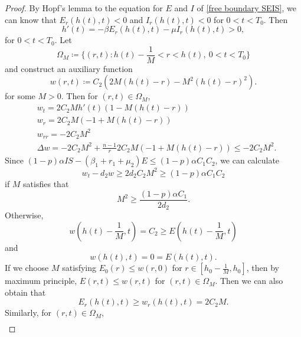 \documentclass[11pt]{amsart}
\numberwithin{equation}{section}
\theoremstyle{plain}
\theoremstyle{definition}
\begin{document}
	\begin{proof}
		By Hopf's lemma to the equation for $E$ and $I$ of \cref{free boundary SEIS}, we can know that $E_r(h(t),t)<0$ and $I_r(h(t),t)<0$ for $0<t<T_0$.
		Then
		\begin{equation*}
			h'(t)=-\beta E_r(h(t),t)-\mu I_r(h(t),t)>0,
		\end{equation*}
		for $0<t<T_0$.
		Let
		\begin{equation*}
			\Omega_M \coloneqq\{(r,t):h(t)-\frac{1}{M}<r<h(t),\ 0<t<T_0\}
		\end{equation*}
		and construct an auxiliary function
		\begin{equation*}
			w(r,t) \coloneqq C_2(2M(h(t)-r)-M^2(h(t)-r)^2).
		\end{equation*}
		for some $M>0$. Then for $(r,t) \in \Omega_M$,
		\begin{equation*}
		\begin{aligned}
			&w_t=2C_2Mh'(t)(1-M(h(t)-r))\\
			&w_r=2C_2M(-1+M(h(t)-r))\\
			&w_{rr}=-2C_2M^2\\
			&\Delta w=-2C_2M^2+\frac{n-1}{r}2C_2M(-1+M(h(t)-r))\leq-2C_2M^2.
		\end{aligned}
		\end{equation*}
		Since $(1-p)\alpha IS-(\beta_1+r_1+\mu_2)E \leq (1-p)\alpha C_1 C_2$, we can calculate
		\begin{equation*}
			w_t-d_2w \geq 2d_2C_2M^2 \geq (1-p) \alpha C_1 C_2
		\end{equation*}
		if $M$ satisfies that
		\begin{equation*}
			M^2 \geq \frac{(1-p)\alpha C_1}{2d_2}.
		\end{equation*}
		Otherwise,
		\begin{equation*}
			w\left(h(t)-\frac{1}{M},t\right)=C_2 \geq E\left(h(t)-\frac{1}{M},t\right)
		\end{equation*}
		and
		\begin{equation*}
			w(h(t),t)=0=E(h(t),t).
		\end{equation*}
		If we choose $M$ satisfying $E_0(r)\leq w(r,0)$ for $r \in [h_0-\frac{1}{M},h_0]$, then by maximum principle, $E(r,t) \leq w(r,t)$ for $(r,t) \in \Omega_M$.
		Then we can also obtain that 
		\begin{equation}
			E_r(h(t),t) \geq w_r(h(t),t)=2C_2M.
		\end{equation}
		Similarly, for $(r,t) \in \Omega_M$,
		\begin{equation*}
			\begin{aligned}

\end{aligned}
\end{equation*}
\end{proof}
\end{document}
